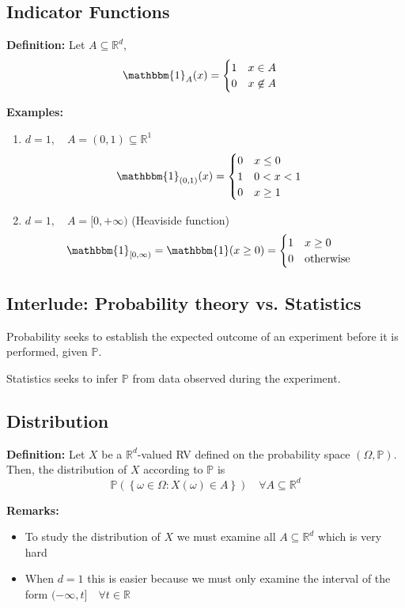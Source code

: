 \documentclass[12pt]{article}
\renewcommand{\P}{\mathbb{P}}
\newcommand{\R}{\mathbb{R}}
\newcommand{\bbm}[1]{\mathbbm{#1}}
\begin{document}
\subsection{Indicator Functions}
\textbf{Definition:} Let $A \subseteq \R^d$, 
\[\mathbbm{1}_A(x) = \begin{cases}
    1 \quad x \in A\\
    0 \quad x \not \in A
\end{cases}\]

\textbf{Examples:}
\begin{enumerate}
    \item $d=1, \quad A = (0, 1) \subseteq \R^1$
    \[\bbm{1}_{(0, 1)}(x) = \begin{cases}
        0 \quad x \leq 0\\
        1 \quad 0 < x < 1\\
        0 \quad x \geq 1
    \end{cases} \]

    \item $d = 1, \quad A = [0, +\infty)$ (Heaviside function)
    \[\bbm{1}_{[0, \infty)} = \bbm{1}(x \geq 0) = \begin{cases}
        1 \quad x \geq 0 \\
        0 \quad \text{otherwise}
    \end{cases}\]
\end{enumerate}

\subsection{Interlude: Probability theory vs. Statistics}
Probability seeks to establish the expected outcome of an experiment before it is performed, given $\P$.

Statistics seeks to infer $\P$ from data observed during the experiment. 

\subsection{Distribution}
\textbf{Definition:} Let $X$ be a $\R^d$-valued RV defined on the probability space $(\Omega, \P)$. Then, the distribution of $X$ according to $\P$ is 
\[\P\left(\left\{ \omega \in \Omega: X(\omega) \in A \right\}\right) \quad \forall A \subseteq \R^d\]

\textbf{Remarks:}
\begin{itemize}
    \item To study the distribution of $X$ we must examine all $A \subseteq \R^d$ which is very hard 
    \item When $d=1$ this is easier because we must only examine the interval of the form $(-\infty, t] \quad \forall t\in \R$
\end{itemize}
\end{document}
